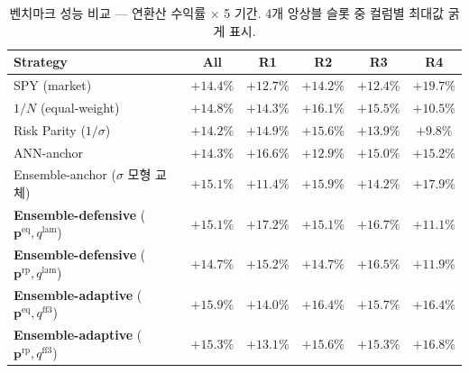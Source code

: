 \documentclass[eng]{kjas3}
\begin{document}
\begin{table}[t]
\centering
\caption{벤치마크 성능 비교 — 연환산 수익률 $\times$ 5 기간. 4개 앙상블 슬롯 중 컬럼별 최대값 굵게 표시.}
\label{tab:benchmark_annret}
\setlength{\tabcolsep}{6pt}
\renewcommand{\arraystretch}{1.15}
\small
\begin{tabular}{lccccc}
\toprule
Strategy & All & R1 & R2 & R3 & R4 \\
\midrule
SPY (market)                       & $+14.4\%$ & $+12.7\%$ & $+14.2\%$ & $+12.4\%$ & $+19.7\%$ \\
$1/N$ (equal-weight)               & $+14.8\%$ & $+14.3\%$ & $+16.1\%$ & $+15.5\%$ & $+10.5\%$ \\
Risk Parity ($1/\sigma$)           & $+14.2\%$ & $+14.9\%$ & $+15.6\%$ & $+13.9\%$ & $+9.8\%$  \\
ANN-anchor \citep{pyo2018}         & $+14.3\%$ & $+16.6\%$ & $+12.9\%$ & $+15.0\%$ & $+15.2\%$ \\
Ensemble-anchor ($\sigma$ 모형 교체) & $+15.1\%$ & $+11.4\%$ & $+15.9\%$ & $+14.2\%$ & $+17.9\%$ \\
\midrule
\textbf{Ensemble-defensive} ($\mathbf{p}^{\mathrm{eq}}, q^{\mathrm{lam}}$) & $+15.1\%$          & $\mathbf{+17.2\%}$ & $+15.1\%$          & $\mathbf{+16.7\%}$ & $+11.1\%$ \\
\textbf{Ensemble-defensive} ($\mathbf{p}^{\mathrm{rp}}, q^{\mathrm{lam}}$) & $+14.7\%$          & $+15.2\%$          & $+14.7\%$          & $+16.5\%$          & $+11.9\%$ \\
\textbf{Ensemble-adaptive}  ($\mathbf{p}^{\mathrm{eq}}, q^{\mathrm{ff3}}$) & $\mathbf{+15.9\%}$ & $+14.0\%$          & $\mathbf{+16.4\%}$ & $+15.7\%$          & $+16.4\%$ \\
\textbf{Ensemble-adaptive}  ($\mathbf{p}^{\mathrm{rp}}, q^{\mathrm{ff3}}$) & $+15.3\%$          & $+13.1\%$          & $+15.6\%$          & $+15.3\%$          & $\mathbf{+16.8\%}$ \\
\bottomrule
\end{tabular}
\end{table}

\newpage
\end{document}
